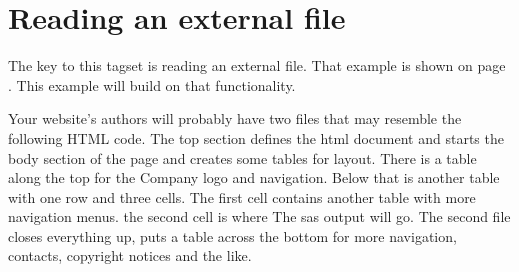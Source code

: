 \section{Reading an external file}

The key to this tagset is reading an external file.  That example is shown
on page \pageref{readfile}.  This example will build on that functionality.

Your website's authors will probably have two files that may resemble the following
HTML code.  The top section defines the html document and starts the body section
of the page and creates some tables for layout.  There is a table along the top for
the Company logo and navigation.  Below that is another table with one row and three
cells.  The first cell contains another table with more navigation menus.  the second
cell is where The sas output will go.  The second file closes everything up, puts a
table across the bottom for more navigation, contacts, copyright notices and the like.

